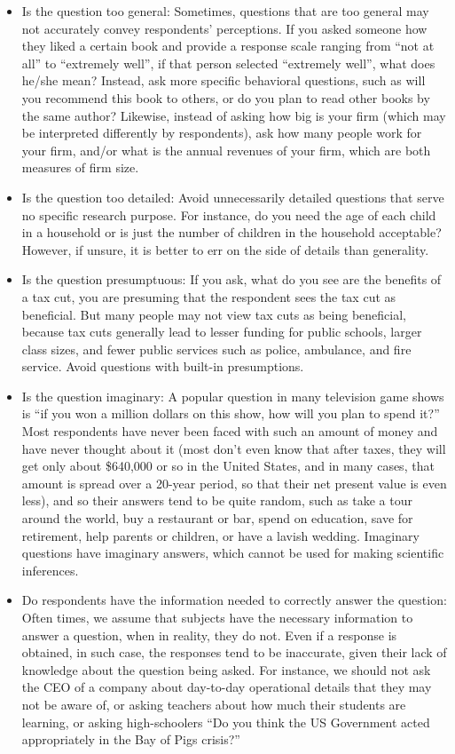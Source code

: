 \begin{itemize}
	\item Is the question too general: Sometimes, questions that are too general may not accurately convey respondents’ perceptions. If you asked someone how they liked a certain book and provide a response scale ranging from “not at all” to “extremely well”, if that person selected “extremely well”, what does he/she mean? Instead, ask more specific behavioral questions, such as will you recommend this book to others, or do you plan to read other books by the same author? Likewise, instead of asking how big is your firm (which may be interpreted differently by respondents), ask how many people work for your firm, and/or what is the annual revenues of your firm, which are both 	measures of firm size.
	\item Is the question too detailed: Avoid unnecessarily detailed questions that serve no specific research purpose. For instance, do you need the age of each child in a household or is just the number of children in the household acceptable? However, if unsure, it is better to err on the side of details than generality.
	\item Is the question presumptuous: If you ask, what do you see are the benefits of a tax cut, you are presuming that the respondent sees the tax cut as beneficial. But many people may not view tax cuts as being beneficial, because tax cuts generally lead to lesser funding for public schools, larger class sizes, and fewer public services such as police, ambulance, and fire service. Avoid questions with built-in presumptions.
	\item Is the question imaginary: A popular question in many television game shows is “if you won a million dollars on this show, how will you plan to spend it?” Most respondents have never been faced with such an amount of money and have never thought about it (most don’t even know that after taxes, they will get only about \$640,000 or so in the United States, and in many cases, that amount is spread over a 20-year period, so that their net present value is even less), and so their answers tend to be quite random, such as take a tour around the world, buy a restaurant or bar, spend on education, save for retirement, help parents or children, or have a lavish wedding. Imaginary questions have imaginary answers, which cannot be used for making scientific inferences.
	\item Do respondents have the information needed to correctly answer the question: Often times, we assume that subjects have the necessary information to answer a question, when in reality, they do not. Even if a response is obtained, in such case, the responses tend to be inaccurate, given their lack of knowledge about the question being asked. For instance, we should not ask the CEO of a company about day-to-day operational details that they may not be aware of, or asking teachers about how much their students are learning, or asking high-schoolers “Do you think the US Government acted appropriately in the Bay of Pigs crisis?”
\end{itemize}


